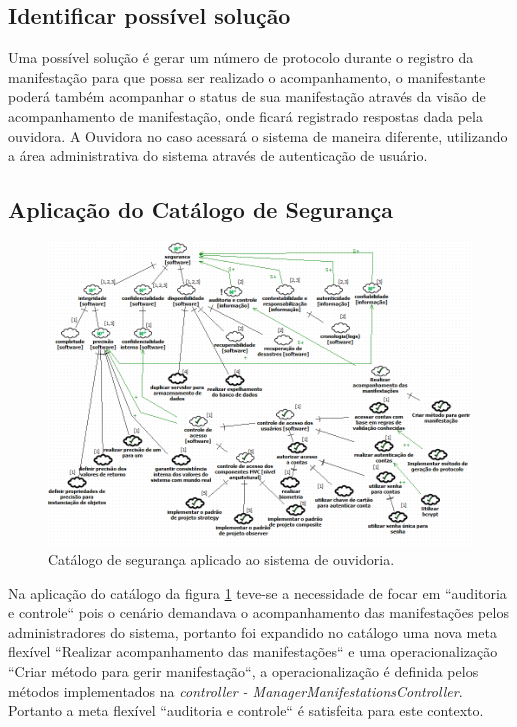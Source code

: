 \subsection{Identificar possível solução}

Uma possível solução é gerar um número de protocolo durante o registro da manifestação para que possa ser realizado o acompanhamento, o manifestante poderá também acompanhar o status de sua manifestação através da visão de acompanhamento de manifestação, onde ficará registrado respostas dada pela ouvidora.
A Ouvidora no caso acessará o sistema de maneira diferente, utilizando a área administrativa do sistema através de autenticação de usuário. 


\subsection{Aplicação do Catálogo de Segurança}

\begin{figure}[h!]
	\centering
	\includegraphics[keepaspectratio=true,scale=0.65]{figuras/catalogoPersona2.PNG}
	\caption{Catálogo de segurança aplicado ao sistema de ouvidoria.}
	\label{catalogoPersona2}
\end{figure}

Na aplicação do catálogo da figura \ref{catalogoPersona2} teve-se a necessidade de focar em ``auditoria e controle`` pois o cenário demandava  o acompanhamento das manifestações pelos administradores do sistema, portanto foi expandido no catálogo uma nova meta flexível ``Realizar acompanhamento das manifestações`` e uma operacionalização ``Criar método para gerir manifestação``, a operacionalização é definida pelos métodos implementados na \textit{controller - ManagerManifestationsController}. Portanto a meta flexível ``auditoria e controle`` é satisfeita para este contexto.

